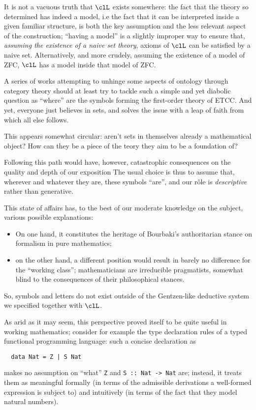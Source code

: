 \documentclass{amsart}
\def\mil#1{\texttt{#1}}
\begin{document}
It is not a vacuous truth that $\clL$ exists somewhere: the fact that the theory so determined has indeed a model, i.e the fact that it can be interpreted inside a given familiar structure, is both the key assumption and the less relevant aspect of the construction; ``having a model'' is a slightly improper way to ensure that, \emph{assuming the existence of a naive set theory}, axioms of $\clL$ can be satisfied by a naive set. Alternatively, and more crudely, assuming the existence of a model of ZFC, $\clL$ has a model inside that model of ZFC. 

A series of works attempting to unhinge some aspects of ontology through category theory should at least try to tackle such a simple and yet diabolic question as ``where'' are the symbols forming the first-order theory of ETCC. And yet, everyone just believes in sets, and solves the issue with a leap of faith from which all else follows.

This appears somewhat circular: aren't sets in themselves already a mathematical object? How can they be a piece of the teory they aim to be a foundation of?

Following this path would have, however, catastrophic consequences on the quality and depth of our exposition The usual choice is thus to assume that, wherever and whatever they are, these symbols ``are'', and our r\^ole is \emph{descriptive} rather than generative.

This state of affairs has, to the best of our moderate knowledge on the subject, various possible explanations:
\begin{itemize}
  \item On one hand, it constitutes the heritage of Bourbaki's authoritarian stance on formalism in pure mathematics;
  \item on the other hand, a different position would result in barely no difference for the ``working class''; mathematicians are irreducible pragmatists, somewhat blind to the consequences of their philosophical stances.
\end{itemize}
So, symbols and letters do not exist outside of the Gentzen-like deductive system we specified together with $\clL$.

As arid as it may seem, this perspective proved itself to be quite useful in working mathematics; consider for example the type declaration rules of a typed functional programming language: such a concise declaration as 
\begin{verbatim}
  data Nat = Z | S Nat
\end{verbatim}
makes no assumption on ``what'' \mil{Z} and \mil{S :: Nat -> Nat} are; instead, it treats them as meaningful formally (in terms of the admissible derivations a well-formed expression is subject to) and intuitively (in terms of the fact that they model natural numbers).
\end{document}
